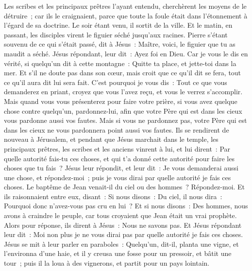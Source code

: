 \begin{multicols}{2}
Les scribes et les principaux prêtres l'ayant entendu, cherchèrent les moyens de le détruire~; car ils le craignaient, parce que toute la foule était dans l'étonnement à l’égard de sa doctrine.
Le soir étant venu, il sortit de la ville.
Et le matin, en passant, les disciples virent le figuier séché jusqu'aux racines.
Pierre s'étant souvenu de ce qui s'était passé, dit à Jésus~: Maître, voici, le figuier que tu as maudit a séché.
Jésus répondant, leur dit~: Ayez foi en Dieu.
Car je vous le dis en vérité, si quelqu'un dit à cette montagne~: Quitte ta place, et jette-toi dans la mer. Et s'il ne doute pas dans son cœur, mais croit que ce qu'il dit se fera, tout ce qu'il aura dit lui sera fait.
C'est pourquoi je vous dis~: Tout ce que vous demanderez en priant, croyez que vous l'avez reçu, et vous le verrez s'accomplir.
Mais quand vous vous présenterez pour faire votre prière, si vous avez quelque chose contre quelqu'un, pardonnez-lui, afin que votre Père qui est dans les cieux vous pardonne aussi vos fautes.
Mais si vous ne pardonnez pas, votre Père qui est dans les cieux ne vous pardonnera point aussi vos fautes.
Ils se rendirent de nouveau à Jérusalem, et pendant que Jésus marchait dans le temple, les principaux prêtres, les scribes et les anciens vinrent à lui,
et lui dirent~: Par quelle autorité fais-tu ces choses, et qui t'a donné cette autorité pour faire les choses que tu fais~?
Jésus leur répondit, et leur dit~: Je vous demanderai aussi une chose, et répondez-moi~; puis je vous dirai par quelle autorité je fais ces choses.
Le baptême de Jean venait-il du ciel ou des hommes~? Répondez-moi.
Et ils raisonnaient entre eux, disant~: Si nous disons~: Du ciel, il nous dira~: Pourquoi donc n'avez-vous pas cru en lui~?
Et si nous disons~: Des hommes, nous avons à craindre le peuple, car tous croyaient que Jean était un vrai prophète.
Alors pour réponse, ils dirent à Jésus~: Nous ne savons pas. Et Jésus répondant leur dit~: Moi non plus je ne vous dirai pas par quelle autorité je fais ces choses.
\VerseOne{}Jésus se mit à leur parler en paraboles~: Quelqu'un, dit-il, planta une vigne, et l'environna d'une haie, et il y creusa une fosse pour un pressoir, et bâtit une tour~; puis il la loua à des vignerons, et partit pour un pays lointain.

\end{multicols}
